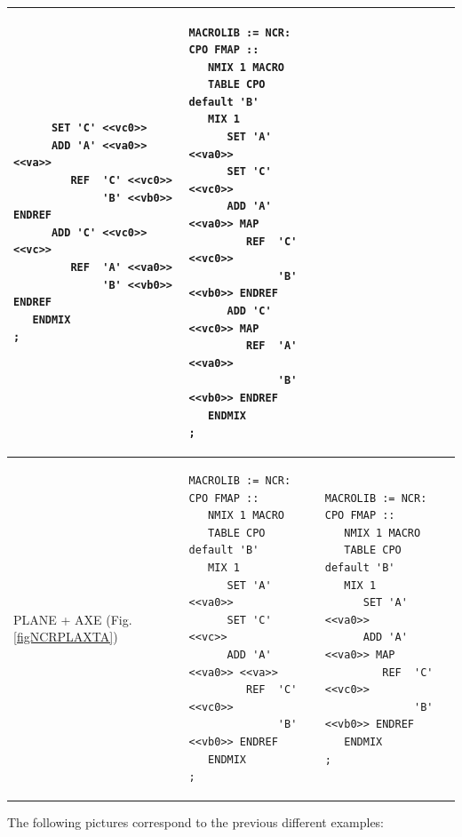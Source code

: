 \begin{center}
\begin{supertabular}{|p{0.1\textwidth}|p{0.4\textwidth}|p{0.4\textwidth}|}
\begin{verbatim}
      SET 'C' <<vc0>>
      ADD 'A' <<va0>> <<va>>
         REF  'C' <<vc0>> 
              'B' <<vb0>> ENDREF
      ADD 'C' <<vc0>> <<vc>>
         REF  'A' <<va0>> 
              'B' <<vb0>> ENDREF
   ENDMIX
;
\end{verbatim} &
\begin{verbatim}
MACROLIB := NCR: CPO FMAP ::
   NMIX 1 MACRO 
   TABLE CPO default 'B' 
   MIX 1 
      SET 'A' <<va0>>
      SET 'C' <<vc0>>
      ADD 'A' <<va0>> MAP
         REF  'C' <<vc0>> 
              'B' <<vb0>> ENDREF
      ADD 'C' <<vc0>> MAP
         REF  'A' <<va0>> 
              'B' <<vb0>> ENDREF
   ENDMIX
;
\end{verbatim} \\
\hline
PLANE + AXE (Fig. \ref{figNCRPLAXTA}) & 
\begin{verbatim}
MACROLIB := NCR: CPO FMAP ::
   NMIX 1 MACRO 
   TABLE CPO default 'B' 
   MIX 1 
      SET 'A' <<va0>>
      SET 'C' <<vc>>
      ADD 'A' <<va0>> <<va>>
         REF  'C' <<vc0>> 
              'B' <<vb0>> ENDREF
   ENDMIX
;
\end{verbatim} &
\begin{verbatim}
MACROLIB := NCR: CPO FMAP ::
   NMIX 1 MACRO 
   TABLE CPO default 'B' 
   MIX 1 
      SET 'A' <<va0>>
      ADD 'A' <<va0>> MAP
         REF  'C' <<vc0>> 
              'B' <<vb0>> ENDREF
   ENDMIX
;
\end{verbatim} \\
\hline
\end{supertabular}
\end{center}

\clearpage

The following pictures correspond to the previous different examples:

